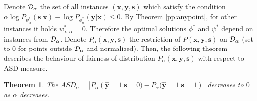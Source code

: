 \documentclass[preprint,12pt]{elsarticle}
\newtheorem{theorem}{Theorem}
\begin{document}
Denote ${\cal D}_\alpha$ the set of all instances $(\mathbf{x},\mathbf{y},\mathbf{s})$ which satisfy the condition
$\alpha\log P_{\psi^*_\alpha}(\mathbf{s}|\mathbf{x})-\log P_{\phi^*_\alpha}(\mathbf{y}|\mathbf{x})\leq 0$. By Theorem \ref{pp:anypoint}, for other instances it holds $w^*_{\mathbf{x},\alpha}=0$. Therefore the optimal solutions $\phi^*$ and $\psi^*$
depend on instances from ${\cal D}_\alpha$. Denote $P_\alpha(\mathbf{x},\mathbf{y},\mathbf{s})$ the restriction of $P(\mathbf{x},\mathbf{y},\mathbf{s})$ 
on ${\cal D}_\alpha$ (set to $0$ for points outside ${\cal D}_\alpha$ and normalized). Then, the following theorem
describes the behaviour of fairness of distribution $P_\alpha(\mathbf{x},\mathbf{y},\mathbf{s})$ with respect to ASD measure.
\begin{theorem}
The $ASD_\alpha=|P_\alpha(\hat{\mathbf{y}}=1|\mathbf{s}=0)-P_\alpha(\hat{\mathbf{y}}=1|\mathbf{s}=1)|$ decreases to $0$
as $\alpha$ decreases.
\end{theorem}
\end{document}

